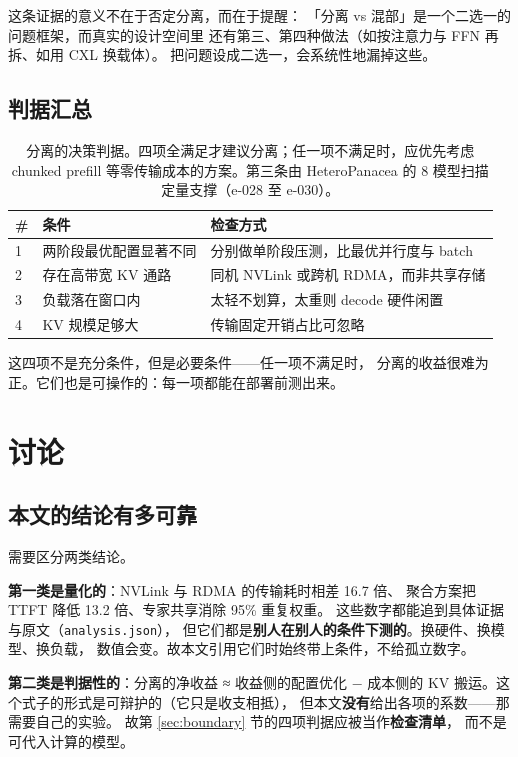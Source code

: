 这条证据的意义不在于否定分离，而在于提醒：
「分离 vs 混部」是一个二选一的问题框架，而真实的设计空间里
还有第三、第四种做法（如按注意力与 FFN 再拆、如用 CXL 换载体）。
把问题设成二选一，会系统性地漏掉这些。

\subsection{判据汇总}

\begin{table}[t]
\centering
\caption{分离的决策判据。四项全满足才建议分离；任一项不满足时，应优先考虑 chunked prefill
等零传输成本的方案。第三条由 HeteroPanacea 的 8 模型扫描定量支撑（e-028 至 e-030）。}
\label{tab:criteria}
\small
\begin{tabular}{@{}p{0.35cm}p{3.0cm}p{2.5cm}@{}}
\toprule
\# & 条件 & 检查方式 \\
\midrule
1 & 两阶段最优配置显著不同 & 分别做单阶段压测，比最优并行度与 batch \\
2 & 存在高带宽 KV 通路 & 同机 NVLink 或跨机 RDMA，而非共享存储 \\
3 & 负载落在窗口内 & 太轻不划算，太重则 decode 硬件闲置 \\
4 & KV 规模足够大 & 传输固定开销占比可忽略 \\
\bottomrule
\end{tabular}
\end{table}

这四项不是充分条件，但是必要条件——任一项不满足时，
分离的收益很难为正。它们也是可操作的：每一项都能在部署前测出来。

\section{讨论}
\label{sec:discuss}

\subsection{本文的结论有多可靠}

需要区分两类结论。

\textbf{第一类是量化的}：NVLink 与 RDMA 的传输耗时相差 16.7 倍、
聚合方案把 TTFT 降低 13.2 倍、专家共享消除 95\% 重复权重。
这些数字都能追到具体证据与原文（\texttt{analysis.json}），
但它们都是\textbf{别人在别人的条件下测的}。换硬件、换模型、换负载，
数值会变。故本文引用它们时始终带上条件，不给孤立数字。

\textbf{第二类是判据性的}：分离的净收益 ≈ 收益侧的配置优化
$-$ 成本侧的 KV 搬运。这个式子的形式是可辩护的（它只是收支相抵），
但本文\textbf{没有}给出各项的系数——那需要自己的实验。
故第 \ref{sec:boundary} 节的四项判据应被当作\textbf{检查清单}，
而不是可代入计算的模型。

